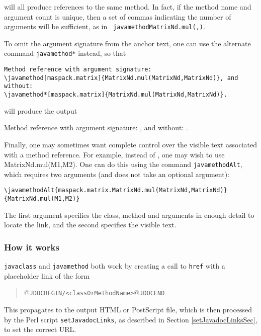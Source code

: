 \documentclass{article}
\begin{document}
will all produce references to the same method. In fact, if the method
name and argument count is unique, then a set of commas indicating the
number of arguments will be sufficient, as in {\tt
\BKS javamethod{MatrixNd.mul(,)}}.

To omit the argument signature from
the anchor text, one can use the alternate command {\tt \BKS javamethod*}
instead, so that

\begin{lstlisting}[]
Method reference with argument signature:
\javamethod[maspack.matrix]{MatrixNd.mul(MatrixNd,MatrixNd)}, and without:
\javamethod*[maspack.matrix]{MatrixNd.mul(MatrixNd,MatrixNd)}.
\end{lstlisting}

will produce the output

Method reference with argument signature:
, and without:
.

Finally, one may sometimes want complete control over the visible text
associated with a method reference. For example,
instead of ,
one may wish to use 
%
{MatrixNd.mul(M1,M2)}. One can do this using the command
{\tt javamethodAlt}, which requires two arguments (and does
not take an optional argument):
%
\begin{lstlisting}[]
\javamethodAlt{maspack.matrix.MatrixNd.mul(MatrixNd,MatrixNd)}{MatrixNd.mul(M1,M2)}
\end{lstlisting}
%
The first argument specifies the class, method and arguments in enough
detail to locate the link, and the second specifies the visible text.

\subsubsection{How it works}
\label{HowJavadocLinksWorkSec}

{\tt \BKS javaclass} and {\tt \BKS javamethod} both work by creating a call
to {\tt \BKS href} with a placeholder link of the form

\begin{quote}
@{\tt JDOCBEGIN/<classOrMethodName>}@{\tt JDOCEND}
\end{quote}

This propagates to the output HTML or PostScript file, which is then
processed by the Perl script {\tt setJavadocLinks}, as described
in Section \ref{setJavadocLinksSec}, to set the correct URL.
\end{document}
